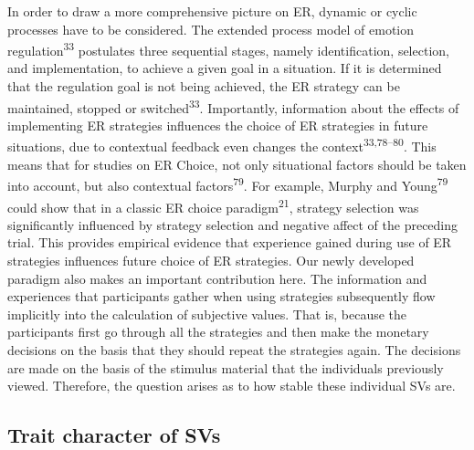 \documentclass[
  man,floatsintext]{apa6}
\begin{document}
In order to draw a more comprehensive picture on ER, dynamic or cyclic processes have to be considered.
The extended process model of emotion regulation\textsuperscript{33} postulates three sequential stages, namely identification, selection, and implementation, to achieve a given goal in a situation.
If it is determined that the regulation goal is not being achieved, the ER strategy can be maintained, stopped or switched\textsuperscript{33}.
Importantly, information about the effects of implementing ER strategies influences the choice of ER strategies in future situations, due to contextual feedback even changes the context\textsuperscript{33,78--80}.
This means that for studies on ER Choice, not only situational factors should be taken into account, but also contextual factors\textsuperscript{79}.
For example, Murphy and Young\textsuperscript{79} could show that in a classic ER choice paradigm\textsuperscript{21}, strategy selection was significantly influenced by strategy selection and negative affect of the preceding trial.
This provides empirical evidence that experience gained during use of ER strategies influences future choice of ER strategies.
Our newly developed paradigm also makes an important contribution here.
The information and experiences that participants gather when using strategies subsequently flow implicitly into the calculation of subjective values.
That is, because the participants first go through all the strategies and then make the monetary decisions on the basis that they should repeat the strategies again.
The decisions are made on the basis of the stimulus material that the individuals previously viewed.
Therefore, the question arises as to how stable these individual SVs are.

\hypertarget{trait-character-of-svs}{%
\subsection{Trait character of SVs}\label{trait-character-of-svs}}
\end{document}
